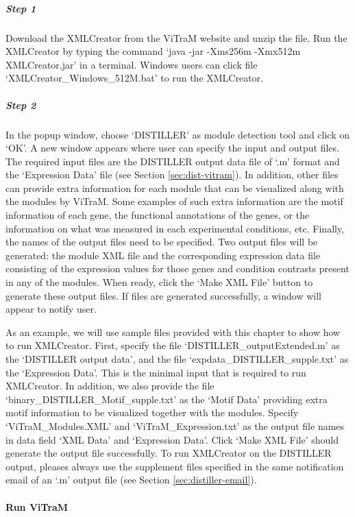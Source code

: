 \begin{adjustwidth}{3mm}{0cm}
\nointerlineskip\leavevmode
\vspace{-5mm}\subparagraph{Step 1} Download the XMLCreator from the ViTraM 
website\cite{ViTraM} and unzip the file. Run the XMLCreator by typing the 
command `java -jar -Xms256m -Xmx512m XMLCreator.jar' in a terminal. Windows 
users can click file `XMLCreator\_Windows\_512M.bat' to run the XMLCreator. 

\subparagraph{Step 2} In the popup window, choose `DISTILLER' as module 
detection tool and click on `OK'. 
A new window appears where user can specify the input and output files. 
The required input files are the DISTILLER output data file of `.m' format and 
the `Expression Data' file (see Section \ref{sec:dist-vitram}). 
In addition, other files can provide extra information for each module that can 
be visualized along with the modules by ViTraM. 
Some examples of such extra information are the motif information of each gene, 
the functional annotations of the genes, or the information on what was 
measured in each experimental conditions, etc.
Finally, the names of the output files need to be specified. Two output files 
will be generated: the module XML file and the corresponding expression data 
file consisting of the expression values for those genes and condition 
contrasts present in any of the modules. 
When ready, click the `Make XML File' button to generate these output files. If 
files are generated successfully, a window will appear to notify user.
\end{adjustwidth}

As an example, we will use sample files provided with this chapter to show how 
to run XMLCreator. First, specify the file `DISTILLER\_outputExtended.m' as the 
`DISTILLER output data', and the file `expdata\_DISTILLER\_supple.txt' as the 
`Expression Data'. This is the minimal input that is required to run 
XMLCreator.
In addition, we also provide the file `binary\_DISTILLER\_Motif\_supple.txt' as 
the `Motif Data' providing extra motif information to be visualized together 
with the modules.
Specify `ViTraM\_Modules.XML' and `ViTraM\_Expression.txt' as the output file 
names in data field `XML Data' and `Expression Data'. Click `Make XML File' 
should generate the output file successfully.
To run XMLCreator on the DISTILLER output, pleases always use the supplement 
files specified in the same notification email of an `.m' output file (see 
Section \ref{sec:distiller-email}).


\paragraph{Run ViTraM}

